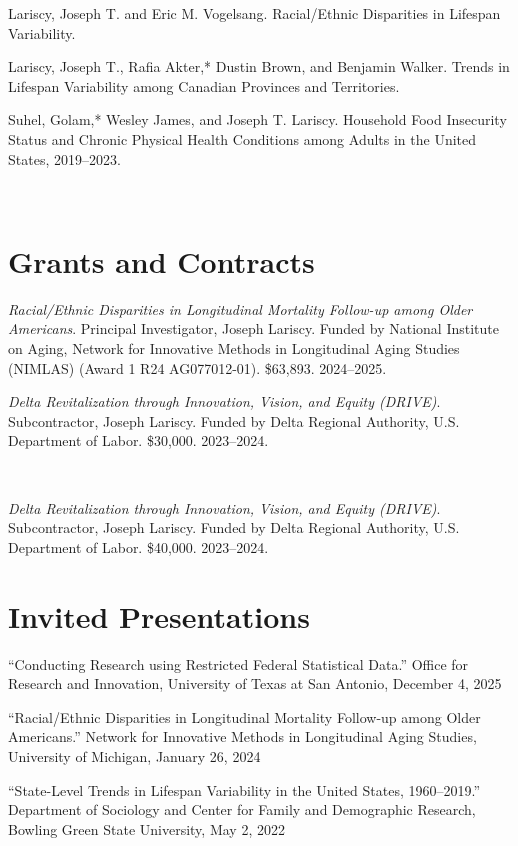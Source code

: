\documentclass[11pt,]{article}
\begin{document}
Lariscy, Joseph T. and Eric M. Vogelsang. Racial/Ethnic Disparities in
Lifespan Variability.

Lariscy, Joseph T., Rafia Akter,* Dustin Brown, and Benjamin Walker.
Trends in Lifespan Variability among Canadian Provinces and Territories.

Suhel, Golam,* Wesley James, and Joseph T. Lariscy. Household Food
Insecurity Status and Chronic Physical Health Conditions among Adults in
the United States, 2019--2023.

~

\section{Grants and Contracts}\label{grants-and-contracts}

\emph{Racial/Ethnic Disparities in Longitudinal Mortality Follow-up
among Older Americans}. Principal Investigator, Joseph Lariscy. Funded
by National Institute on Aging, Network for Innovative Methods in
Longitudinal Aging Studies (NIMLAS) (Award 1 R24 AG077012-01). \$63,893.
2024--2025.

\emph{Delta Revitalization through Innovation, Vision, and Equity
(DRIVE)}. Subcontractor, Joseph Lariscy. Funded by Delta Regional
Authority, U.S. Department of Labor. \$30,000. 2023--2024.

~

\emph{Delta Revitalization through Innovation, Vision, and Equity
(DRIVE)}. Subcontractor, Joseph Lariscy. Funded by Delta Regional
Authority, U.S. Department of Labor. \$40,000. 2023--2024.

\section{Invited Presentations}\label{invited-presentations}

``Conducting Research using Restricted Federal Statistical Data.''
Office for Research and Innovation, University of Texas at San Antonio,
December 4, 2025

``Racial/Ethnic Disparities in Longitudinal Mortality Follow-up among
Older Americans.'' Network for Innovative Methods in Longitudinal Aging
Studies, University of Michigan, January 26, 2024

``State-Level Trends in Lifespan Variability in the United States,
1960--2019.'' Department of Sociology and Center for Family and
Demographic Research, Bowling Green State University, May 2, 2022
\end{document}
